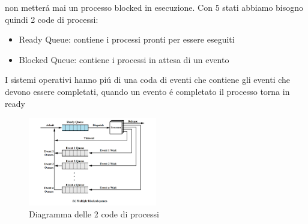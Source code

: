 non metterá mai un processo blocked in esecuzione.
Con 5 stati abbiamo bisogno quindi 2 code di processi:
\begin{itemize}
    \item Ready Queue: contiene i processi pronti per essere eseguiti
    \item Blocked Queue: contiene i processi in attesa di un evento
\end{itemize}
I sistemi operativi hanno piú di una coda di eventi che contiene gli eventi che devono essere completati, quando un evento é completato
il processo torna in ready
\begin{figure}
    \centering
    \includegraphics[width=0.5\textwidth]{immagini/5StatiCode2}
    \caption{Diagramma delle 2 code di processi}
\end{figure}
